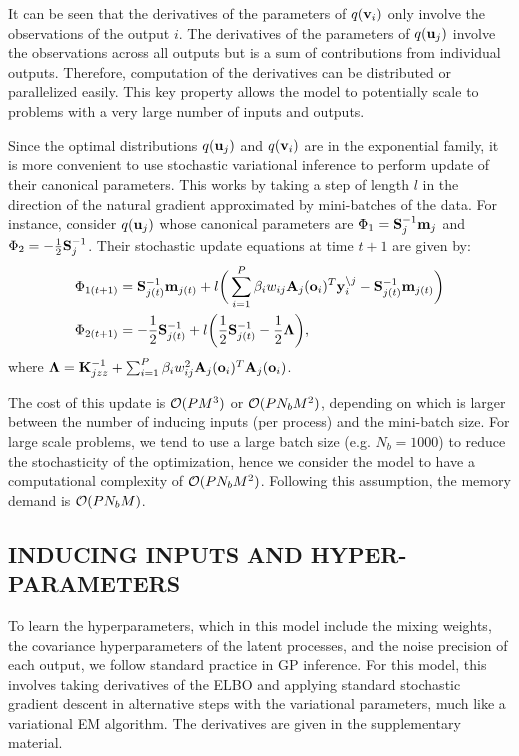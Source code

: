 \noindent It can be seen that the derivatives of the parameters of $q(\v_i)$ only involve the observations of the output $i$.
The derivatives of the parameters of $q(\u_j)$ involve the observations across all outputs but is a sum of contributions from individual outputs.
Therefore, computation of the derivatives can be distributed or parallelized easily.
This key property allows the model to potentially scale to problems with a very large number of inputs and outputs.

Since the optimal distributions $q(\u_j)$ and $q(\v_i)$ are in the exponential family, it is more convenient to use stochastic variational inference \citep{hensman2012fast,hensmangaussian} to perform update of their canonical parameters.
This works by taking a step of length $l$ in the direction of the natural gradient approximated by mini-batches of the data.
For instance, consider $q(\u_j)$ whose canonical parameters are $\Phi_1 = \S_j^{-1} \m_j$ and $\Phi_2 = -\frac{1}{2}\S_j^{-1}$.
Their stochastic update equations at time $t + 1$ are given by:
\begin{align}
\Phi_{1(t+1)} &= \S_{j(t)}^{-1} \m_{j(t)} + l \bigg(\sum_{i=1}^P \beta_i w_{ij} \A_j(\oi)^T \ynoj - \S_{j(t)}^{-1} \m_{j(t)} \bigg) \\
\Phi_{2(t+1)} &= -\frac{1}{2} \S_{j(t)}^{-1} + l \bigg(\frac{1}{2} \S_{j(t)}^{-1} - \frac{1}{2} \mat{\Lambda} \bigg),
\end{align}
where $\mat{\Lambda} = \Kjzz^{-1} + \sum_{i=1}^P \beta_i w_{ij}^2 \A_j(\oi)^T \A_j(\oi)$.

The cost of this update is $\calO(PM^3)$ or $\calO(PN_bM^2)$, depending on which is larger between the number of inducing inputs (per process) and the mini-batch size.
For large scale problems, we tend to use a large batch size (e.g. $N_b = 1000$) to reduce the stochasticity of the optimization, hence we consider the model to have a computational complexity of $\calO(PN_bM^2)$.
Following this assumption, the memory demand is $\calO(PN_bM)$.
\subsection{INDUCING INPUTS AND HYPER-PARAMETERS \label{sec:hyperparameters}}
To learn the hyperparameters, which in this model include the mixing weights, the covariance hyperparameters of the latent processes, and the noise precision of each output, we follow standard practice in GP inference.
For this model, this involves taking derivatives of the ELBO and applying standard stochastic gradient descent in alternative steps with the variational parameters, much like a variational EM algorithm. 
The derivatives are given in the supplementary material.

